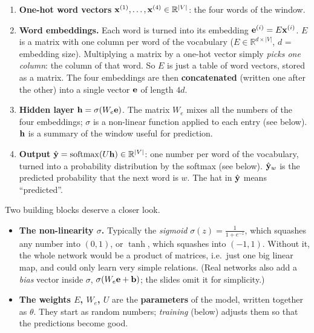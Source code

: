 \begin{enumerate}
  \item \textbf{One-hot word vectors} $\mathbf{x}^{(1)}, \ldots, \mathbf{x}^{(4)} \in
        \mathbb R^{|V|}$: the four words of the window.
  \item \textbf{Word embeddings.} Each word is turned into its embedding
        $\mathbf{e}^{(i)} = E \mathbf{x}^{(i)}$. $E$ is a matrix with one column per word of
        the vocabulary ($E \in \mathbb R^{d \times |V|}$, $d$ = embedding size).
        Multiplying a matrix by a one-hot vector simply \emph{picks one column}: the
        column of that word. So $E$ is just a table of word vectors, stored as a
        matrix. The four embeddings are then \textbf{concatenated} (written one after
        the other) into a single vector $\mathbf{e}$ of length $4d$.
  \item \textbf{Hidden layer} $\mathbf{h} = \sigma(W_e \mathbf{e})$. The matrix $W_e$ mixes all
        the numbers of the four embeddings; $\sigma$ is a non-linear function applied
        to each entry (see below). $\mathbf{h}$ is a summary of the window useful for
        prediction.
  \item \textbf{Output} $\hat{\mathbf{y}} = \operatorname{softmax}(U \mathbf{h}) \in \mathbb R^{|V|}$: one
        number per word of the vocabulary, turned into a probability distribution by
        the softmax (see below). $\hat{\mathbf{y}}_w$ is the predicted probability that
        the next word is $w$. The hat in $\hat{\mathbf{y}}$ means ``predicted''.
\end{enumerate}

\notinslides
Two building blocks deserve a closer look.
\begin{itemize}
  \item \textbf{The non-linearity $\sigma$.} Typically the \emph{sigmoid}
        $\sigma(z) = \frac{1}{1 + e^{-z}}$, which squashes any number into $(0, 1)$, or
        $\tanh$, which squashes into $(-1, 1)$. Without it, the whole network would be
        a product of matrices, i.e.\ just one big linear map, and could only learn
        very simple relations. (Real networks also add a \emph{bias} vector inside
        $\sigma$, $\sigma(W_e \mathbf{e} + \mathbf{b})$; the slides omit it for simplicity.)
  \item \textbf{The weights $E$, $W_e$, $U$} are the \textbf{parameters} of the model,
        written together as $\theta$. They start as random numbers; \emph{training}
        (below) adjusts them so that the predictions become good.
\end{itemize}

